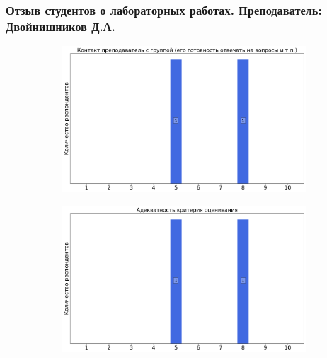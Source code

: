     \subsubsection{Отзыв студентов о лабораторных работах. Преподаватель: Двойнишников Д.А. }
		\begin{figure}[H]
			\centering
			\begin{subfigure}[b]{0.45\textwidth}
				\centering
				\includegraphics[width=\textwidth]{images/2 course/Радиотехнические цепи и сигналы/labniks-marks-Двойнишников Д.А. -0.png}
			\end{subfigure}
			\begin{subfigure}[b]{0.45\textwidth}
				\centering
				\includegraphics[width=\textwidth]{images/2 course/Радиотехнические цепи и сигналы/labniks-marks-Двойнишников Д.А. -1.png}
			\end{subfigure}
			\begin{subfigure}[b]{0.45\textwidth}
				\centering

\end{subfigure}
\end{figure}
